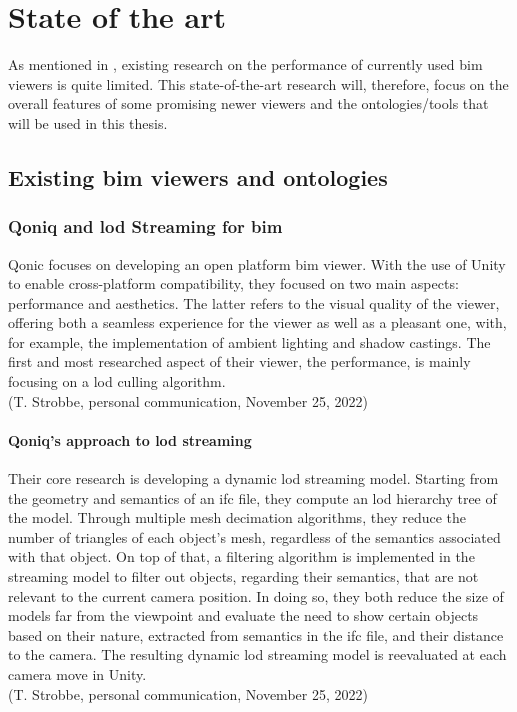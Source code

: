 \chapter{State of the art} \label{ch:stateOfTheArt}
As mentioned in \cite{Johansson2015}, existing research on the performance of currently used \ac{bim} viewers is quite limited. This state-of-the-art research will, therefore, focus on the overall features of some promising newer viewers and the ontologies/tools that will be used in this thesis.

\section{Existing \acs{bim} viewers and ontologies}
\subsection{Qoniq and \acs{lod} Streaming for \acs{bim}}
Qonic focuses on developing an open platform \ac{bim} viewer. With the use of Unity to enable cross-platform compatibility, they focused on two main aspects: performance and aesthetics. The latter refers to the visual quality of the viewer, offering both a seamless experience for the viewer as well as a pleasant one, with, for example, the implementation of ambient lighting and shadow castings. The first and most researched aspect of their viewer, the performance, is mainly focusing on a \ac{lod} culling algorithm.
\\(T. Strobbe, personal communication, November 25, 2022)

\subsubsection{Qoniq's approach to \acs{lod} streaming}
Their core research is developing a dynamic \ac{lod} streaming model. Starting from the geometry and semantics of an \ac{ifc} file, they compute an \ac{lod} hierarchy tree of the model. Through multiple mesh decimation algorithms, they reduce the number of triangles of each object's mesh, regardless of the semantics associated with that object. On top of that, a filtering algorithm is implemented in the streaming model to filter out objects, regarding their semantics, that are not relevant to the current camera position. In doing so, they both reduce the size of models far from the viewpoint and evaluate the need to show certain objects based on their nature, extracted from semantics in the \ac{ifc} file, and their distance to the camera. The resulting dynamic \ac{lod} streaming model is reevaluated at each camera move in Unity.
\\(T. Strobbe, personal communication, November 25, 2022)

